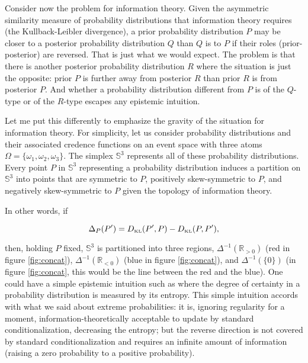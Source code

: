 \documentclass[11pt]{article}
\begin{document}
Consider now the problem for information theory. Given the asymmetric
similarity measure of probability distributions that information
theory requires (the Kullback-Leibler divergence), a prior probability
distribution $P$ may be closer to a posterior probability distribution
$Q$ than $Q$ is to $P$ if their roles (prior-posterior) are reversed.
That is just what we would expect. The problem is that there is
another posterior probability distribution $R$ where the situation is
just the opposite: prior $P$ is further away from posterior $R$ than
prior $R$ is from posterior $P$. And whether a probability
distribution different from $P$ is of the $Q$-type or of the $R$-type
escapes any epistemic intuition.

Let me put this differently to emphasize the gravity of the situation
for information theory. For simplicity, let us consider probability
distributions and their associated credence functions on an event
space with three atoms $\Omega=\{\omega_{1},\omega_{2},\omega_{3}\}$.
The simplex $\mathbb{S}^{3}$ represents all of these probability
distributions. Every point $P$ in $\mathbb{S}^{3}$ representing a
probability distribution induces a partition on $\mathbb{S}^{3}$ into
points that are symmetric to $P$, positively skew-symmetric to $P$,
and negatively skew-symmetric to $P$ given the topology of information
theory.

In other words, if

\begin{equation}
  \label{eq:sksy}
  \Delta_{P}(P')=D_{\mbox{\tiny KL}}(P',P)-D_{\mbox{\tiny KL}}(P,P'),
\end{equation}

then, holding $P$ fixed, $\mathbb{S}^{3}$ is partitioned into three
regions, $\Delta^{-1}(\mathbb{R}_{>0})$ (red in figure
\ref{fig:concat}), $\Delta^{-1}(\mathbb{R}_{<0})$ (blue in figure
\ref{fig:concat}), and $\Delta^{-1}(\{0\})$ (in figure
\ref{fig:concat}, this would be the line between the red and the
blue). One could have a simple epistemic intuition such as  where the degree of certainty in a probability
distribution is measured by its entropy. This simple intuition accords
with what we said about extreme probabilities: it is, ignoring
regularity for a moment, information-theoretically acceptable to
update by standard conditionalization, decreasing the entropy; but the
reverse direction is not covered by standard conditionalization and
requires an infinite amount of information (raising a zero probability
to a positive probability).
\end{document}
